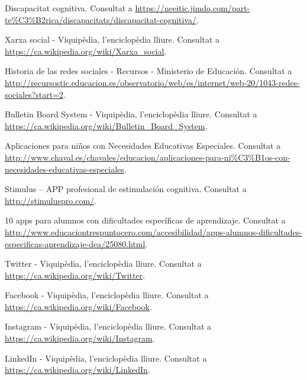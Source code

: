 \documentclass[11pt,catalan,listoffigures,listoftables]{tfgetsinf}
\begin{document}
\begin{thebibliography}{10}

   Discapacitat cognitiva.
   \newblock Consultat a 
   \url{https://neeitic.jimdo.com/part-te\%C3\%B2rica/discapacitats/discapacitat-cognitiva/}.

   Xarxa social - Viquipèdia, l'enciclopèdia lliure.
   \newblock Consultat a 
   \url{https://ca.wikipedia.org/wiki/Xarxa_social}.
   
   Historia de las redes sociales - Recursos - Ministerio de Educación.
   \newblock Consultat a 
   \url{http://recursostic.educacion.es/observatorio/web/es/internet/web-20/1043-redes-sociales?start=2}.

   Bulletin Board System - Viquipèdia, l'enciclopèdia lliure.
   \newblock Consultat a 
   \url{https://ca.wikipedia.org/wiki/Bulletin_Board_System}.

   Aplicaciones para niños con Necesidades Educativas Especiales.
   \newblock Consultat a 
   \url{http://www.chaval.es/chavales/educacion/aplicaciones-para-ni\%C3\%B1os-con-necesidades-educativas-especiales}.

   Stimulus – APP profesional de estimulación cognitiva.
   \newblock Consultat a 
   \url{http://stimuluspro.com/}.

   10 apps para alumnos con dificultades específicas de aprendizaje.
   \newblock Consultat a 
   \url{http://www.educaciontrespuntocero.com/accesibilidad/apps-alumnos-dificultades-especificas-aprendizaje-dea/25080.html}.

   Twitter - Viquipèdia, l'enciclopèdia lliure.
   \newblock Consultat a 
   \url{https://ca.wikipedia.org/wiki/Twitter}.

   Facebook - Viquipèdia, l'enciclopèdia lliure.
   \newblock Consultat a 
   \url{https://ca.wikipedia.org/wiki/Facebook}.

   Instagram - Viquipèdia, l'enciclopèdia lliure.
   \newblock Consultat a 
   \url{https://ca.wikipedia.org/wiki/Instagram}.

   LinkedIn - Viquipèdia, l'enciclopèdia lliure.
   \newblock Consultat a 
   \url{https://ca.wikipedia.org/wiki/LinkedIn}.
   

\end{thebibliography}
\end{document}
